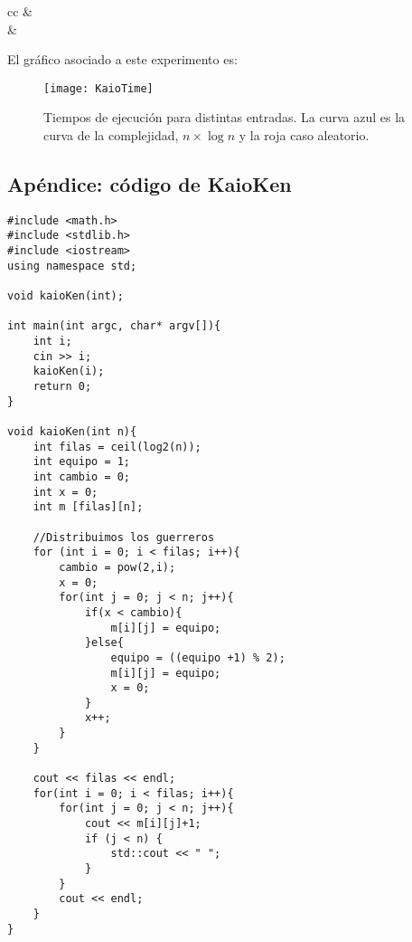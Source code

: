 \begin{table}[h!]
\begin{tabular}{cc}
                        &                                                                                                                                      \\ \hline
{}                  &  \\ \hline
\end{tabular}
\caption{Tabla que muestra los tiempos de ejecución promedio correspondientes a distintos tamaños de entrada.}
\end{table}

El gráfico asociado a este experimento es:
\begin{figure}[h!]
  \centering
  \texttt{[image: KaioTime]}
  \caption{Tiempos de ejecución para distintas entradas. La curva azul es la curva de la complejidad, $n \times \log n$ y la roja caso aleatorio.}
\end{figure}







\newpage

\subsection{Apéndice: código de KaioKen}
\begin{lstlisting}
#include <math.h>
#include <stdlib.h>
#include <iostream>
using namespace std;

void kaioKen(int);

int main(int argc, char* argv[]){
	int i;
	cin >> i;
	kaioKen(i);
	return 0;
}

void kaioKen(int n){
	int filas = ceil(log2(n));
	int equipo = 1;
	int cambio = 0;
	int x = 0;
	int m [filas][n];

	//Distribuimos los guerreros
	for (int i = 0; i < filas; i++){
		cambio = pow(2,i);
		x = 0;
		for(int j = 0; j < n; j++){
			if(x < cambio){
				m[i][j] = equipo;
			}else{
				equipo = ((equipo +1) % 2);
				m[i][j] = equipo;
				x = 0;
			}
			x++;
		}
	}

	cout << filas << endl;
	for(int i = 0; i < filas; i++){
		for(int j = 0; j < n; j++){
			cout << m[i][j]+1;
			if (j < n) {
				std::cout << " ";
			}
		}
		cout << endl;
	}
}
\end{lstlisting}

